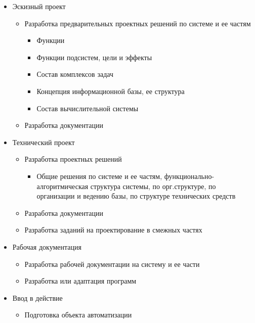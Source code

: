 \documentclass[12pt]{article}
\begin{document}
\begin{sloppypar}
\begin{itemize}
        \item Эскизный проект
              \begin{itemize}
                  \item Разработка предварительных проектных решений по системе и ее частям
                        \begin{itemize}
                            \item Функции
                            \item Функции подсистем, цели и эффекты
                            \item Состав комплексов задач
                            \item Концепция информационной базы, ее структура
                            \item Состав вычислительной системы
                        \end{itemize}
                  \item Разработка документации
              \end{itemize}
        \item Технический проект
              \begin{itemize}
                  \item Разработка проектных решений
                        \begin{itemize}
                            \item Общие решения по системе и ее частям, функционально-алгоритмическая структура системы, по орг.структуре, по организации и ведению базы, по структуре технических средств
                        \end{itemize}
                  \item Разработка документации
                  \item Разработка заданий на проектирование в смежных частях
              \end{itemize}
        \item Рабочая документация
              \begin{itemize}
                  \item Разработка рабочей документации на систему и ее части
                  \item Разработка или адаптация программ
              \end{itemize}
        \item Ввод в действие
              \begin{itemize}
                  \item Подготовка объекта автоматизации

\end{itemize}
\end{itemize}
\end{sloppypar}
\end{document}

